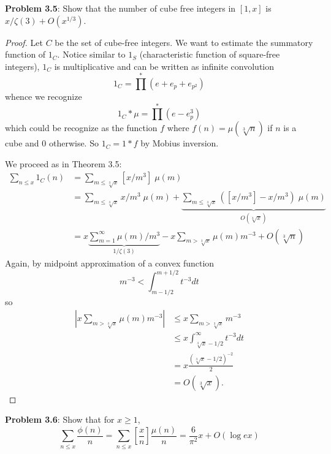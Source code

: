 \documentclass{article}
\newcommand{\IntPart}[1]{\left[ #1 \right]}
\newcommand{\O}[1]{O\left( #1 \right)}
\begin{document}
\fi

\textbf{Problem 3.5}: Show that the number of cube free integers in $[1, x]$ is $x/\zeta(3) + \O{ x^{1/3} }$.

\begin{proof}
Let $C$ be the set of cube-free integers. We want to estimate the summatory function of $1_C$. Notice similar to $1_S$ (characteristic function of square-free integers), $1_C$ is multiplicative and can be written as infinite convolution
$$1_C = \prod^* (e + e_p + e_{p^2})$$
whence we recognize
$$1_C * \mu = \prod^* (e - e_p^3)$$
which could be recognize as the function $f$ where $f(n) = \mu(\sqrt[3]{n})$ if $n$ is a cube and 0 otherwise. So $1_C = 1 * f$ by Mobius inversion.

We proceed as in Theorem 3.5:
\begin{align*}
\sum_{n \leq x} 1_C(n) &= \sum_{m \leq \sqrt[3]{x}} [x/m^3] \; \mu(m)\\
&= \sum_{m \leq \sqrt[3]{x}} x/m^3 \; \mu(m) + \underbrace{\sum_{m \leq \sqrt[3]{x}} ([x/m^3] - x/m^3) \; \mu(m)}_{\O{ \sqrt[3]{x} }}\\
&= x \underbrace{\sum_{m = 1}^{\infty} \mu(m)/m^3}_{1/\zeta(3)} - x \sum_{m > \sqrt[3]{x}} \mu(m) m^{-3} + \O{ \sqrt[3]{n} }
\end{align*}
Again, by midpoint approximation of a convex function
$$m^{-3} < \int_{m-1/2}^{m+1/2} t^{-3} dt$$
so
\begin{align*}
\left|x \sum_{m > \sqrt[3]{x}} \mu(m) m^{-3}\right| &\leq x \sum_{m > \sqrt[3]{x}} m^{-3}\\
&\leq x \int_{\sqrt[3]{x} - 1/2}^{\infty} t^{-3} dt\\
&= x \frac{(\sqrt[3]{x} - 1/2)^{-2}}{2}\\
&= \O{ \sqrt[3]{x} }.
\end{align*}
\end{proof}

\textbf{Problem 3.6}: Show that for $x \geq 1$,
$$\sum_{n \leq x} \frac{\phi(n)}{n} = \sum_{n \leq x} \IntPart{\frac{x}{n}} \frac{\mu(n)}{n} = \frac{6}{\pi^2} x + \O{ \log ex }$$
\end{document}
